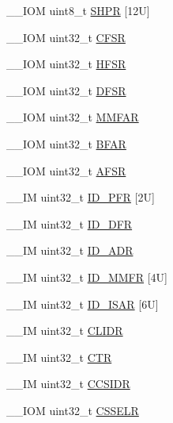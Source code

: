 \begin{DoxyCompactItemize}
\+\_\+\+\_\+\+I\+OM uint8\+\_\+t \hyperlink{struct_s_c_b___type_afdab23abd301033bb318c7b188b377db}{S\+H\+PR} \mbox{[}12\+U\mbox{]}
\item 
\+\_\+\+\_\+\+I\+OM uint32\+\_\+t \hyperlink{struct_s_c_b___type_a0cda9e061b42373383418663092ad19a}{C\+F\+SR}
\item 
\+\_\+\+\_\+\+I\+OM uint32\+\_\+t \hyperlink{struct_s_c_b___type_a14ad254659362b9752c69afe3fd80934}{H\+F\+SR}
\item 
\+\_\+\+\_\+\+I\+OM uint32\+\_\+t \hyperlink{struct_s_c_b___type_a191579bde0d21ff51d30a714fd887033}{D\+F\+SR}
\item 
\+\_\+\+\_\+\+I\+OM uint32\+\_\+t \hyperlink{struct_s_c_b___type_a2d03d0b7cec2254f39eb1c46c7445e80}{M\+M\+F\+AR}
\item 
\+\_\+\+\_\+\+I\+OM uint32\+\_\+t \hyperlink{struct_s_c_b___type_a3f8e7e58be4e41c88dfa78f54589271c}{B\+F\+AR}
\item 
\+\_\+\+\_\+\+I\+OM uint32\+\_\+t \hyperlink{struct_s_c_b___type_ab65372404ce64b0f0b35e2709429404e}{A\+F\+SR}
\item 
\+\_\+\+\_\+\+IM uint32\+\_\+t \hyperlink{struct_s_c_b___type_a7a23d21186bc6aa71855a68666202984}{I\+D\+\_\+\+P\+FR} \mbox{[}2\+U\mbox{]}
\item 
\+\_\+\+\_\+\+IM uint32\+\_\+t \hyperlink{struct_s_c_b___type_ada1d3119c020983fdc949c2ccd406caa}{I\+D\+\_\+\+D\+FR}
\item 
\+\_\+\+\_\+\+IM uint32\+\_\+t \hyperlink{struct_s_c_b___type_aa5c5a6ccc7042927ce3feadc41872aa4}{I\+D\+\_\+\+A\+DR}
\item 
\+\_\+\+\_\+\+IM uint32\+\_\+t \hyperlink{struct_s_c_b___type_ad3ce108b65d07e91c4a1054d50e4bd8a}{I\+D\+\_\+\+M\+M\+FR} \mbox{[}4\+U\mbox{]}
\item 
\+\_\+\+\_\+\+IM uint32\+\_\+t \hyperlink{struct_s_c_b___type_a5be03d185d9bde32c5b9028f792f8e1e}{I\+D\+\_\+\+I\+S\+AR} \mbox{[}6\+U\mbox{]}
\item 
\+\_\+\+\_\+\+IM uint32\+\_\+t \hyperlink{struct_s_c_b___type_ad9899f5775251cf5ef0cb0845527afc2}{C\+L\+I\+DR}
\item 
\+\_\+\+\_\+\+IM uint32\+\_\+t \hyperlink{struct_s_c_b___type_af3fe705fef8762763b6d61dbdf0ccc3d}{C\+TR}
\item 
\+\_\+\+\_\+\+IM uint32\+\_\+t \hyperlink{struct_s_c_b___type_afd063c9297a1a3b67e6d1d5e179e6a0e}{C\+C\+S\+I\+DR}
\item 
\+\_\+\+\_\+\+I\+OM uint32\+\_\+t \hyperlink{struct_s_c_b___type_ad3884e8b6504ec63c1eaa8742e94df3d}{C\+S\+S\+E\+LR}
\item 

\end{DoxyCompactItemize}
